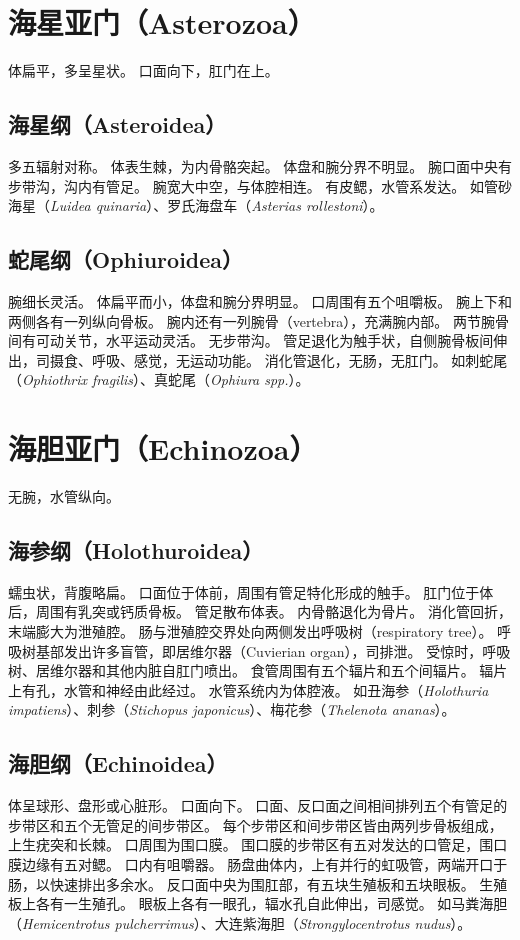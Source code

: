 \documentclass[11pt]{article}
\begin{document}
\section{海星亚门（Asterozoa）}
体扁平，多呈星状。
口面向下，肛门在上。

\subsection{海星纲（Asteroidea）}
多五辐射对称。
体表生棘，为内骨骼突起。
体盘和腕分界不明显。
腕口面中央有步带沟，沟内有管足。
腕宽大中空，与体腔相连。
有皮鳃，水管系发达。
如管砂海星（\textit{Luidea quinaria}）、罗氏海盘车（\textit{Asterias rollestoni}）。

\subsection{蛇尾纲（Ophiuroidea）}
腕细长灵活。
体扁平而小，体盘和腕分界明显。
口周围有五个咀嚼板。
腕上下和两侧各有一列纵向骨板。
腕内还有一列腕骨（vertebra），充满腕内部。
两节腕骨间有可动关节，水平运动灵活。
无步带沟。
管足退化为触手状，自侧腕骨板间伸出，司摄食、呼吸、感觉，无运动功能。
消化管退化，无肠，无肛门。
如刺蛇尾（\textit{Ophiothrix fragilis}）、真蛇尾（\textit{Ophiura spp.}）。
  
\section{海胆亚门（Echinozoa）}
无腕，水管纵向。

\subsection{海参纲（Holothuroidea）}
蠕虫状，背腹略扁。
口面位于体前，周围有管足特化形成的触手。
肛门位于体后，周围有乳突或钙质骨板。
管足散布体表。
内骨骼退化为骨片。
消化管回折，末端膨大为泄殖腔。
肠与泄殖腔交界处向两侧发出呼吸树（respiratory tree）。
呼吸树基部发出许多盲管，即居维尔器（Cuvierian organ），司排泄。
受惊时，呼吸树、居维尔器和其他内脏自肛门喷出。
食管周围有五个辐片和五个间辐片。
辐片上有孔，水管和神经由此经过。
水管系统内为体腔液。
如丑海参（\textit{Holothuria impatiens}）、刺参（\textit{Stichopus japonicus}）、梅花参（\textit{Thelenota ananas}）。

\subsection{海胆纲（Echinoidea）}
体呈球形、盘形或心脏形。
口面向下。
口面、反口面之间相间排列五个有管足的步带区和五个无管足的间步带区。
每个步带区和间步带区皆由两列步骨板组成，上生疣突和长棘。
口周围为围口膜。
围口膜的步带区有五对发达的口管足，围口膜边缘有五对鳃。
口内有咀嚼器。
肠盘曲体内，上有并行的虹吸管，两端开口于肠，以快速排出多余水。
反口面中央为围肛部，有五块生殖板和五块眼板。
生殖板上各有一生殖孔。
眼板上各有一眼孔，辐水孔自此伸出，司感觉。
如马粪海胆（\textit{Hemicentrotus pulcherrimus}）、大连紫海胆（\textit{Strongylocentrotus nudus}）。
\end{document}

